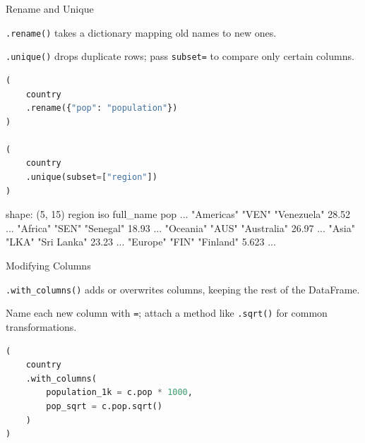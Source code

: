 \documentclass[8pt,aspectratio=169]{beamer}
\begin{document}
\begin{frame}[fragile]{Rename and Unique}
\begin{splitcode}{%

\texttt{.rename()} takes a dictionary mapping old names to new ones.

\texttt{.unique()} drops duplicate rows; pass \texttt{subset=} to compare only certain columns.

}
\begin{lstlisting}[language=Python]
(
    country
    .rename({"pop": "population"})
)

(
    country
    .unique(subset=["region"])
)
\end{lstlisting}
\begin{codeoutput}
shape: (5, 15)
region      iso    full_name    pop    ...
"Americas"  "VEN"  "Venezuela"  28.52  ...
"Africa"    "SEN"  "Senegal"    18.93  ...
"Oceania"   "AUS"  "Australia"  26.97  ...
"Asia"      "LKA"  "Sri Lanka"  23.23  ...
"Europe"    "FIN"  "Finland"    5.623  ...
\end{codeoutput}
\end{splitcode}
\end{frame}

\begin{frame}[fragile]{Modifying Columns}
\begin{splitcode}{%

\texttt{.with\_columns()} adds or overwrites columns, keeping the rest of the DataFrame.

Name each new column with \texttt{=}; attach a method like \texttt{.sqrt()} for common transformations.

}
\begin{lstlisting}[language=Python]
(
    country
    .with_columns(
        population_1k = c.pop * 1000,
        pop_sqrt = c.pop.sqrt()
    )
)
\end{lstlisting}
\end{splitcode}
\end{frame}
\end{document}
